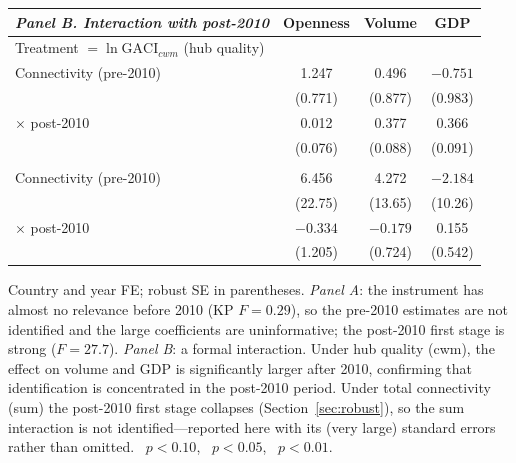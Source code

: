\begin{table}[t]
\begin{threeparttable}
\vspace{0.6em}
\begin{tabular}{lccc}
\toprule
\emph{Panel B. Interaction with post-2010} & Openness & Volume & GDP \\
\midrule
\multicolumn{4}{l}{Treatment $=\ln\mathrm{GACI}_{cwm}$ (hub quality)}\\
Connectivity (pre-2010) & 1.247   & 0.496   & $-0.751$ \\
                        & (0.771) & (0.877) & (0.983) \\
$\times$ post-2010      & 0.012   & 0.377\sym{***} & 0.366\sym{***} \\
                        & (0.076) & (0.088) & (0.091) \\
\addlinespace
\multicolumn{4}{l}{Treatment $=\ln\mathrm{GACI}_{sum}$ (total connectivity)}\\
Connectivity (pre-2010) & 6.456   & 4.272   & $-2.184$ \\
                        & (22.75) & (13.65) & (10.26) \\
$\times$ post-2010      & $-0.334$ & $-0.179$ & 0.155 \\
                        & (1.205) & (0.724) & (0.542) \\
\bottomrule
\end{tabular}
\begin{tablenotes}\footnotesize
\item Country and year FE; robust SE in parentheses. \emph{Panel A}: the
instrument has almost no relevance before 2010 (KP $F=0.29$), so the pre-2010
estimates are not identified and the large coefficients are uninformative; the
post-2010 first stage is strong ($F=27.7$). \emph{Panel B}: a formal
interaction. Under hub quality (cwm), the effect on volume and GDP is
significantly larger after 2010, confirming that identification is concentrated
in the post-2010 period. Under total connectivity (sum) the post-2010 first
stage collapses (Section~\ref{sec:robust}), so the sum interaction is not
identified---reported here with its (very large) standard errors rather than
omitted. \sym{*}~$p<0.10$, \sym{**}~$p<0.05$, \sym{***}~$p<0.01$.
\end{tablenotes}
\end{threeparttable}
\end{table}
